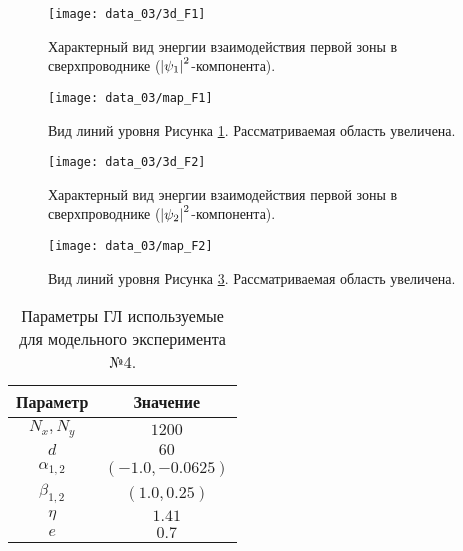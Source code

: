 \begin{figure}[h!]
    \center
    \texttt{[image: data\_03/3d\_F1]}
    \caption{Характерный вид энергии взаимодействия первой зоны в 
        сверхпроводнике (\( \left| \psi_1 \right|^2 \)-компонента).}
    \label{img:3d-band-1-03}
\end{figure}

\begin{figure}[h!]
    \center
    \texttt{[image: data\_03/map\_F1]}
    \caption{Вид линий уровня Рисунка \ref{img:3d-band-1-03}. 
        Рассматриваемая область увеличена.}
    \label{img:map-band-1-03}
\end{figure}

\begin{figure}[h!]
    \center
    \texttt{[image: data\_03/3d\_F2]}
    \caption{Характерный вид энергии взаимодействия первой зоны в 
        сверхпроводнике (\( \left| \psi_2 \right|^2 \)-компонента).}
    \label{img:3d-band-2-03}
\end{figure}

\begin{figure}[h!]
    \center
    \texttt{[image: data\_03/map\_F2]}
    \caption{Вид линий уровня Рисунка \ref{img:3d-band-2-03}. 
        Рассматриваемая область увеличена.}
    \label{img:map-band-2-03}
\end{figure}

\clearpage


\begin{table}[h!]
    \centering
    \begin{tabular}{|c|c|}
        \hline 
        Параметр           & Значение              \\ \hline
        \( N_x, N_y \)     & \( 1200 \)            \\ \hline
        \( d \)            & \( 60 \)              \\ \hline
        \( \alpha_{1,2} \) & \( (-1.0, -0.0625) \) \\ \hline
        \( \beta_{1,2} \)  & \( (1.0, 0.25) \)     \\ \hline
        \( \eta \)         & \( 1.41 \)            \\ \hline
        \( e \)            & \( 0.7 \)             \\ \hline
    \end{tabular}
    \caption{Параметры ГЛ используемые для модельного эксперимента №4.}
    \label{param:04}
\end{table}

